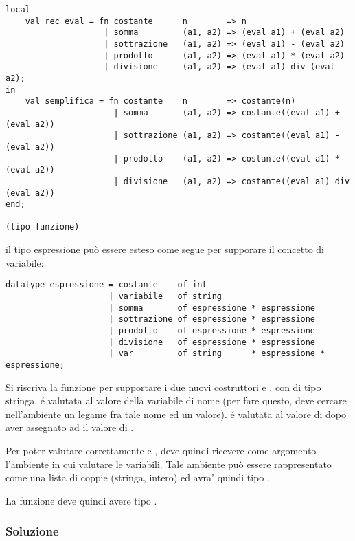 \begin{lstlisting}[style = SML, caption = {Definizione della funzione \sml{semplifica}}]
local
	val rec eval = fn costante		n        => n
					| somma			(a1, a2) => (eval a1) + (eval a2)
					| sottrazione	(a1, a2) => (eval a1) - (eval a2)
					| prodotto		(a1, a2) => (eval a1) * (eval a2)
					| divisione		(a1, a2) => (eval a1) div (eval a2);
in
	val semplifica = fn costante	n        => costante(n)
					  | somma		(a1, a2) => costante((eval a1) + (eval a2))
					  | sottrazione	(a1, a2) => costante((eval a1) - (eval a2))
					  | prodotto	(a1, a2) => costante((eval a1) * (eval a2))
					  | divisione	(a1, a2) => costante((eval a1) div (eval a2))
end;

(tipo funzione)
\end{lstlisting}

il tipo espressione può essere esteso come segue per supporare il concetto di variabile:

\begin{lstlisting}[style = SML, caption = {Definizione del tipo di dato \sml{espressione}}]
datatype espressione = costante    of int
					 | variabile   of string
					 | somma       of espressione * espressione
					 | sottrazione of espressione * espressione
					 | prodotto    of espressione * espressione
					 | divisione   of espressione * espressione
					 | var         of string      * espressione * espressione;
\end{lstlisting}

Si riscriva la funzione  per supportare i due nuovi costruttori  e , con  di tipo stringa, é valutata al valore della variabile di nome  (per fare questo,  deve cercare nell'ambiente un legame fra tale nome ed un valore). %
 é valutata al valore di  dopo aver assegnato ad  il valore di .

\medskip
Per poter valutare correttamente  e ,  deve quindi ricevere come argomento l'ambiente in cui valutare le variabili. %
Tale ambiente può essere rappresentato come una lista di coppie (stringa, intero) ed avra' quindi tipo .

\medskip
La funzione  deve quindi avere tipo .

\subsubsection{Soluzione}

